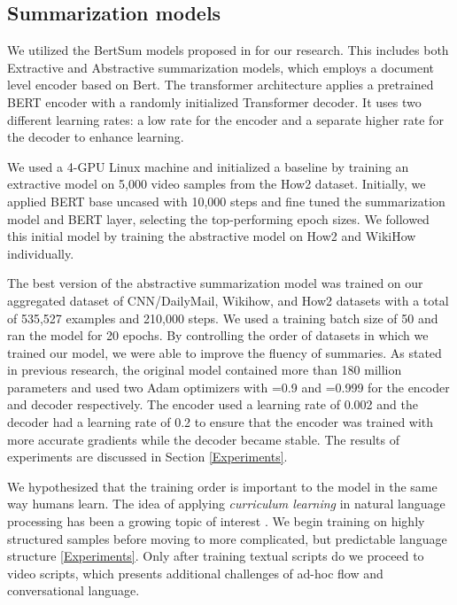 \documentclass[sigconf]{acmart}
\begin{document}
\subsection{Summarization models}

We utilized the BertSum models proposed in \cite{liu-lapata-2019-text}  for our research. This includes both Extractive and Abstractive summarization models, which employs a document level encoder based on Bert. The transformer architecture applies a pretrained BERT encoder with a randomly initialized Transformer decoder. It uses two different learning rates: a low rate for the encoder and a separate higher rate for the decoder to enhance learning.

We used a 4-GPU Linux machine and initialized a baseline by training an extractive model on 5,000 video samples from the How2 dataset.  Initially, we applied BERT base uncased with 10,000 steps and fine tuned the summarization model and BERT layer, selecting the top-performing epoch sizes. We followed this initial model by training the abstractive model on How2 and WikiHow individually.


The best version of the abstractive summarization model was trained on our aggregated dataset of CNN/DailyMail, Wikihow, and How2 datasets with a total of 535,527 examples and 210,000 steps. We used a training batch size of 50 and ran the model for 20 epochs. By controlling the order of datasets in which we trained our model, we were able to improve the fluency of summaries. As stated in previous research, the original model contained more than 180 million parameters and used two Adam optimizers with =0.9 and  =0.999 for the encoder and decoder respectively. The encoder used a learning rate of 0.002 and the decoder had a learning rate of 0.2 to ensure that the encoder was trained with more accurate gradients while the decoder became stable. The results of experiments are discussed in Section \ref{Experiments}.

We hypothesized that the training order is important to the model in the same way humans learn. The idea of applying \emph{curriculum learning} \cite{conf/icml/BengioLCW09} in natural language processing has been a growing topic of interest \cite{xu-etal-2020-curriculum}. We begin training on highly structured samples before moving to more complicated, but predictable language structure \ref{Experiments}. Only after training textual scripts do we proceed to video scripts, which presents additional challenges of ad-hoc flow and conversational language.
\end{document}
